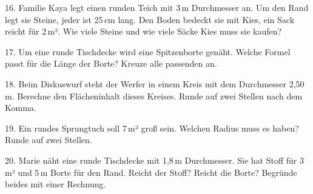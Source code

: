 \documentclass[11pt]{article}
\begin{document}
\begin{pfaufg}{}{16.}{}
Familie Kaya legt einen runden Teich mit 3\,m Durchmesser an. Um den Rand legt sie Steine, jeder ist 25\,cm lang. Den Boden bedeckt sie mit Kies, ein Sack reicht für 2\,m². Wie viele Steine und wie viele Säcke Kies muss sie kaufen?
\end{pfaufg}

\begin{pfaufg}{}{17.}{}
Um eine runde Tischdecke wird eine Spitzenborte genäht. Welche Formel passt für die Länge der Borte? Kreuze alle passenden an.\par\smallskip {}\par {}
\end{pfaufg}

\begin{pfaufg}{}{18.}{}
Beim Diskuswurf steht der Werfer in einem Kreis mit dem Durchmesser 2,50\,m. Berechne den Flächeninhalt dieses Kreises. Runde auf zwei Stellen nach dem Komma.
\end{pfaufg}

\begin{pfaufg}{}{19.}{}
Ein rundes Sprungtuch soll 7\,m² groß sein. Welchen Radius muss es haben? Runde auf zwei Stellen.
\end{pfaufg}

\begin{pfaufg}{}{20.}{}
Marie näht eine runde Tischdecke mit 1,8\,m Durchmesser. Sie hat Stoff für 3\,m² und 5\,m Borte für den Rand. Reicht der Stoff? Reicht die Borte? Begründe beides mit einer Rechnung.
\end{pfaufg}

\par\vfill{}
\end{document}

